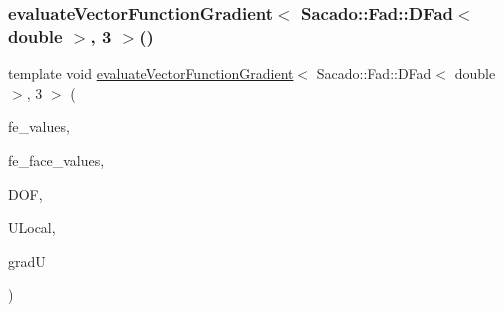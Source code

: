 \subsubsection{\texorpdfstring{evaluate\+Vector\+Function\+Gradient$<$ Sacado\+::\+Fad\+::\+D\+Fad$<$ double $>$, 3 $>$()}{evaluateVectorFunctionGradient< Sacado::Fad::DFad< double >, 3 >()}\hspace{0.1cm}{\footnotesize\ttfamily [3/4]}}
{\footnotesize\ttfamily template void \mbox{\hyperlink{group___evaluation_functions_ga9608539d601a91aff1ba01ccc720fbe0}{evaluate\+Vector\+Function\+Gradient}}$<$ Sacado\+::\+Fad\+::\+D\+Fad$<$ double $>$, 3 $>$ (\begin{DoxyParamCaption}\item[{const F\+E\+Values$<$ 3 $>$ \&}]{fe\+\_\+values,  }\item[{const F\+E\+Face\+Values$<$ 3 $>$ \&}]{fe\+\_\+face\+\_\+values,  }\item[{unsigned int}]{D\+OF,  }\item[{Table$<$ 1, Sacado\+::\+Fad\+::\+D\+Fad$<$ double $>$$>$ \&}]{U\+Local,  }\item[{Table$<$ 3, Sacado\+::\+Fad\+::\+D\+Fad$<$ double $>$$>$ \&}]{gradU }\end{DoxyParamCaption})}

\mbox{\label{function_evaluations_8cc_ab4669516f8f9436b73dedeb24cc0ffff}} 

